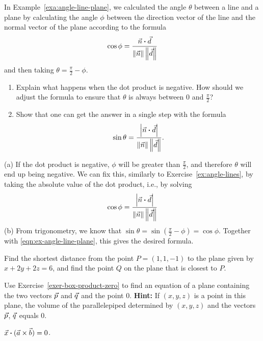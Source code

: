 \documentclass{ximera}
\begin{document}
\begin{exercise}
  In Example~\ref{exa:angle-line-plane}, we calculated the angle
  $\theta$ between a line and a plane by calculating the angle $\phi$
  between the direction vector of the line and the normal vector of
  the plane according to the formula
  \begin{equation*}
    \cos\phi =
    \frac{\vec{n}\boldsymbol{\cdot}\vec{d}}{\left\|\vec{n}\right\|\left\|\vec{d}\right\|}
  \end{equation*}
  and then taking $\theta = \frac{\pi}{2}-\phi$.
  \begin{enumerate}
  \item Explain what happens when the dot product is negative. How
    should we adjust the formula to ensure that $\theta$ is always
    between $0$ and $\frac{\pi}{2}$?
  \item Show that one can get the answer in a single step with the
    formula
    \begin{equation*}
      \sin\theta =
      \frac{\left|\vec{n}\boldsymbol{\cdot}\vec{d}\right|}{\left\|\vec{n}\right\|\left\|\vec{d}\right\|}.
    \end{equation*}
  \end{enumerate}
  \begin{solution}
    (a) If the dot product is negative, $\phi$ will be greater than
    $\frac{\pi}{2}$, and therefore $\theta$ will end up being
    negative. We can fix this, similarly to
    Exercise~\ref{ex:angle-lines}, by taking the absolute value of the
    dot product, i.e., by solving
    \begin{equation}\label{eqn:ex-angle-line-plane}
      \cos\phi =
      \frac{\left|\vec{n}\boldsymbol{\cdot}\vec{d}\right|}{\left\|\vec{n}\right\|\left\|\vec{d}\right\|}
    \end{equation}
    (b) From trigonometry, we know that $\sin\theta =
    \sin(\frac{\pi}{2}-\phi) = \cos\phi$. Together with
    {\eqref{eqn:ex-angle-line-plane}}, this gives the desired formula.
  \end{solution}
\end{exercise}

\begin{exercise}
  Find the shortest distance from the point $P = (1,1,-1)$ to the plane
  given by $x + 2y + 2z = 6$, and find the point $Q$ on the plane
  that is closest to $P$.
\end{exercise}

\begin{exercise}
  Use Exercise~\ref{exer-box-product-zero} to find an equation of a
  plane containing the two vectors $\vec{p}$ and $\vec{q}$ and the
  point $0$. \textbf{Hint:} If $(x,y,z)$ is a point in this
  plane, the volume of the parallelepiped determined by $(x,y,z)$
  and the vectors $\vec{p}$, $\vec{q}$ equals 0.
  \begin{solution}
    $\vec{x}\boldsymbol{\cdot} (\vec{a}\times \vec{b}) =0$.
  \end{solution}
\end{exercise}
\end{document}
